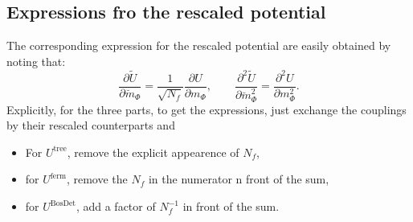 \subsection*{Expressions fro the rescaled potential}
The corresponding expression for the rescaled potential are easily obtained by noting that:
\begin{equation}\label{eq:derivativesOfRescaledPotential}
 \frac{\partial \tilde U}{\partial \breve m_{\Phi}} = \frac{1}{\sqrt{N_f}}\frac{\partial U}{\partial m_{\Phi}},\qquad
 \frac{\partial^2 \tilde U}{\partial \breve m_{\Phi}^2} = \frac{\partial^2 U}{\partial m_{\Phi}^2}.
\end{equation}
Explicitly, for the three parts, to get the expressions, just exchange the couplings by their rescaled counterparts and
\begin{itemize}
 \item For $U^{\text{tree}}$, remove the explicit appearence of $N_f$,
 \item for $U^{\text{ferm}}$, remove the $N_f$ in the numerator n front of the sum,
 \item for $U^{\text{BosDet}}$, add a factor of $N_f^{-1}$ in front of the sum.
\end{itemize}


